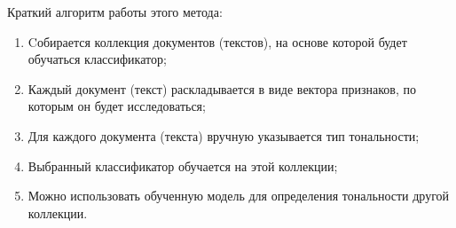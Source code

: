 Краткий алгоритм работы этого метода:
\begin{enumerate}
\item Cобирается коллекция документов (текстов), на основе которой будет обучаться
  классификатор; 
\item Каждый документ (текст) раскладывается в виде вектора признаков, по которым
  он будет исследоваться; 
\item Для каждого документа (текста) вручную указывается тип тональности;
\item Выбранный классификатор обучается на этой коллекции;
\item Можно использовать обученную модель для определения тональности другой
  коллекции.
\end{enumerate}

\FloatBarrier

